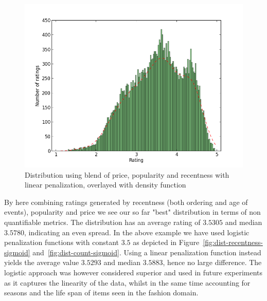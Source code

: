 \begin{figure}[H]
  \centering
  \includegraphics[scale=0.5]{image/dist-blend-price-popularity-recentness}
  \caption[Distribution using blend of price, popularity and recentness with
  linear penalization]{Distribution using blend of price, popularity and recentness with
  linear penalization, overlayed with density function}
  \label{dist-blend-price}
\end{figure}

By here combining ratings generated by recentness (both ordering and age of
events), popularity and price we see our so far "best" distribution in terms of
non quantifiable metrics. The distribution has an average rating of $3.5305$
and median $3.5780$, indicating an even spread. In the above example we have
used logistic penalization functions with constant $3.5$ as depicted in
Figure~\ref{fig:dist-recentness-sigmoid} and~\ref{fig:dist-count-sigmoid}. Using a
linear penalization function instead yields the average value $3.5293$ and
median $3.5883$, hence no large difference. The logistic approach was however
considered superior and used in future experiments as it captures the linearity
of the data, whilst in the same time accounting for seasons and the life span
of items seen in the fashion domain.

